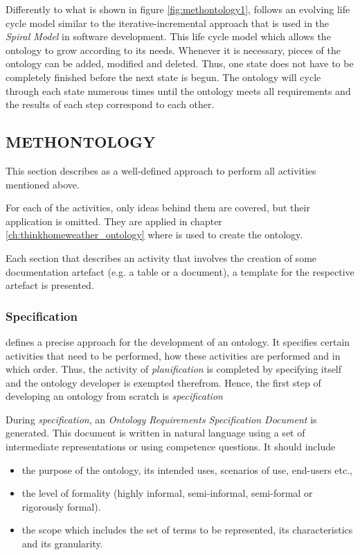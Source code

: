 Differently to what is shown in figure \ref{fig:methontology1}, \methontology follows an evolving life cycle model similar to the iterative-incremental approach that is used in the \emph{Spiral Model} in software development\cite{spiral_model}. This life cycle model which allows the ontology to grow according to its needs. Whenever it is necessary, pieces of the ontology can be added, modified and deleted. Thus, one state does not have to be completely finished before the next state is begun. The ontology will cycle through each state numerous times until the ontology meets all requirements and the results of each step correspond to each other.

\subsection{METHONTOLOGY}
\label{sec:methontology}

This section describes \methontology as a well-defined approach to perform all activities mentioned above.

For each of the activities, only ideas behind them are covered, but their application is omitted. They are applied in chapter \ref{ch:thinkhomeweather_ontology} where \methontology is used to create the \thinkhomeweather ontology.

Each section that describes an activity that involves the creation of some documentation artefact (e.g. a table or a document), a template for the respective artefact is presented.

\subsubsection{Specification}

\methontology defines a precise approach for the development of an ontology. It specifies certain activities that need to be performed, how these activities are performed and in which order. Thus, the activity of \emph{planification} is completed by specifying \methontology itself and the ontology developer is exempted therefrom. Hence, the first step of developing an ontology from scratch is \emph{specification}

During \emph{specification}, an \emph{Ontology Requirements Specification Document} is generated. This document is written in natural language using a set of intermediate representations or using competence questions. It should include

\begin{itemize} %
  \item the purpose of the ontology, its intended uses, scenarios of use, end-users etc.,
  \item the level of formality (highly informal, semi-informal, semi-formal or rigorously formal). %
  \item the scope which includes the set of terms to be represented, its characteristics and its granularity.
\end{itemize}

